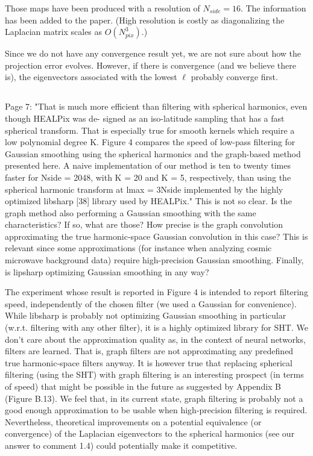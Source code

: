 \documentclass[12pt,a4paper]{article}
\newcommand{\1}{\b{1}}              %
\newcommand{\0}{\b{0}}              %
\begin{document}
Those maps have been produced with a resolution of $N_{side}=16$. The information has been added to the paper. (High resolution is costly as diagonalizing the Laplacian matrix scales as $O(N_{pix}^3)$.)

Since we do not have any convergence result yet, we are not sure about how the projection error evolves. However, if there is convergence (and we believe there is), the eigenvectors associated with the lowest $\ell$ probably converge first.

\subsection{}
\begin{mdframed}[style=comment]
Page 7: "That is much more efficient than filtering with spherical harmonics, even though HEALPix was de- signed as an iso-latitude sampling that has a fast spherical transform. That is especially true for smooth kernels which require a low polynomial degree K. Figure 4 compares the speed of low-pass filtering for Gaussian smoothing using the spherical harmonics and the graph-based method presented here. A naive implementation of our method is ten to twenty times faster for Nside = 2048, with K = 20 and K = 5, respectively, than using the spherical harmonic transform at lmax = 3Nside implemented by the highly optimized libsharp [38] library used by HEALPix." This is not so clear. Is the graph method also performing a Gaussian smoothing with the same characteristics? If so, what are those? How precise is the graph convolution approximating the true harmonic-space Gaussian convolution in this case? This is relevant since some approximations (for instance when analyzing cosmic microwave background data) require high-precision Gaussian smoothing. Finally, is lipsharp optimizing Gaussian smoothing in any way?
\end{mdframed}

The experiment whose result is reported in Figure 4 is intended to report filtering speed, independently of the chosen filter (we used a Gaussian for convenience).
While libsharp is probably not optimizing Gaussian smoothing in particular (w.r.t. filtering with any other filter), it is a highly optimized library for SHT.
We don't care about the approximation quality as, in the context of neural networks, filters are learned.
That is, graph filters are not approximating any predefined true harmonic-space filters anyway.
It is however true that replacing spherical filtering (using the SHT) with graph filtering is an interesting prospect (in terms of speed) that might be possible in the future as suggested by Appendix B (Figure B.13).
We feel that, in its current state, graph filtering is probably not a good enough approximation to be usable when high-precision filtering is required.
Nevertheless, theoretical improvements on a potential equivalence (or convergence) of the Laplacian eigenvectors to the spherical harmonics (see our answer to comment 1.4) could potentially make it competitive.
\end{document}
